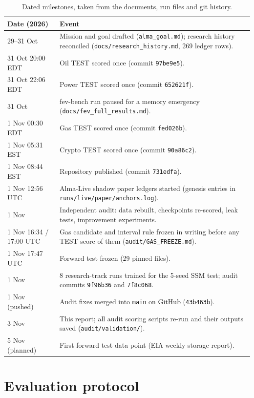 \documentclass[10pt,a4paper]{article}
\newcommand{\src}[1]{{\footnotesize\texttt{#1}}}
\begin{document}
\begin{table}[H]
\centering\small
\caption{Dated milestones, taken from the documents, run files and git history.}
\label{tab:timeline}
\begin{tabularx}{\linewidth}{@{}p{3.4cm}X@{}}
\toprule
Date (2026) & Event\\
\midrule
29--31 Oct & Mission and goal drafted (\src{alma\_goal.md}); research history reconciled (\src{docs/research\_history.md}, 269 ledger rows).\\
31 Oct 20:00 EDT & Oil TEST scored once (commit \texttt{97be9e5}).\\
31 Oct 22:06 EDT & Power TEST scored once (commit \texttt{652621f}).\\
31 Oct & fev-bench run paused for a memory emergency (\src{docs/fev\_full\_results.md}).\\
1 Nov 00:30 EDT & Gas TEST scored once (commit \texttt{fed026b}).\\
1 Nov 05:31 EST & Crypto TEST scored once (commit \texttt{90a86c2}).\\
1 Nov 08:44 EST & Repository published (commit \texttt{731edfa}).\\
1 Nov 12:56 UTC & Alma-Live shadow paper ledgers started (genesis entries in \src{runs/live/paper/anchors.log}).\\
1 Nov & Independent audit: data rebuilt, checkpoints re-scored, leak tests, improvement experiments.\\
1 Nov 16:34 / 17:00 UTC & Gas candidate and interval rule frozen in writing before any TEST score of them (\src{audit/GAS\_FREEZE.md}).\\
1 Nov 17:47 UTC & Forward test frozen (29 pinned files).\\
1 Nov & 8 research-track runs trained for the 5-seed SSM test; audit commits \texttt{9f96b36} and \texttt{7f8c068}.\\
1 Nov (pushed) & Audit fixes merged into \texttt{main} on GitHub (\texttt{43b463b}).\\
3 Nov & This report; all audit scoring scripts re-run and their outputs saved (\src{audit/validation/}).\\
5 Nov (planned) & First forward-test data point (EIA weekly storage report).\\
\bottomrule
\end{tabularx}
\end{table}

\section{Evaluation protocol}
\label{sec:protocol}
\end{document}
